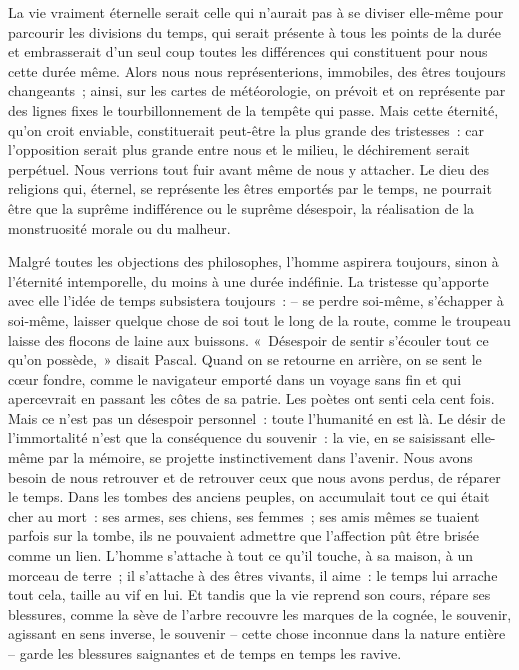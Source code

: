 \documentclass[french,twoside]{book} %
\begin{document}
La vie vraiment éternelle serait celle qui n’aurait pas à se diviser elle-même pour parcourir les divisions du temps, qui serait présente à tous les points de la durée et embrasserait d’un seul coup toutes les différences qui constituent pour nous cette durée même. Alors nous nous représenterions, immobiles, des êtres toujours changeants ; ainsi, sur les cartes de météorologie, on prévoit et on représente par des lignes fixes le tourbillonnement de la tempête qui passe. Mais cette éternité, qu’on croit enviable, constituerait peut-être la plus grande des tristesses : car l’opposition serait plus grande entre nous et le milieu, le déchirement serait perpétuel. Nous verrions tout fuir avant même de nous y attacher. Le dieu des religions qui, éternel, se représente les êtres emportés par le temps, ne pourrait être que la suprême indifférence ou le suprême désespoir, la réalisation de la monstruosité morale ou du malheur.\par
Malgré toutes les objections des philosophes, l’homme aspirera toujours, sinon à l’éternité intemporelle, du moins à une durée indéfinie. La tristesse qu’apporte avec elle l’idée de temps subsistera toujours : – se perdre soi-même, s’échapper à soi-même, laisser quelque chose de soi tout le long de la route, comme le troupeau laisse des flocons de laine aux buissons. « Désespoir de sentir s’écouler tout ce qu’on possède, » disait Pascal. Quand on se retourne en arrière, on se sent le cœur fondre, comme le navigateur emporté dans un voyage sans fin et qui apercevrait en passant les côtes de sa patrie. Les poètes ont senti cela cent fois. Mais ce n’est pas un désespoir personnel : toute l’humanité en est là. Le désir de l’immortalité n’est que la conséquence du souvenir : la vie, en se saisissant elle-même par la mémoire, se projette instinctivement dans l’avenir. Nous avons besoin de nous retrouver et de retrouver ceux que nous avons perdus, de réparer le temps. Dans les tombes des anciens peuples, on accumulait tout ce qui était cher au mort : ses armes, ses chiens, ses femmes ; ses amis mêmes se tuaient parfois sur la tombe, ils ne pouvaient admettre que l’affection pût être brisée comme un lien. L’homme s’attache à tout ce qu’il touche, à sa maison, à un morceau de terre ; il s’attache à des êtres vivants, il aime : le temps lui arrache tout cela, taille au vif en lui. Et tandis que la vie reprend son cours, répare ses blessures, comme la sève de l’arbre recouvre les marques de la cognée, le souvenir, agissant en sens inverse, le souvenir – cette chose inconnue dans la nature entière – garde les blessures saignantes et de temps en temps les ravive.\par
\end{document}
